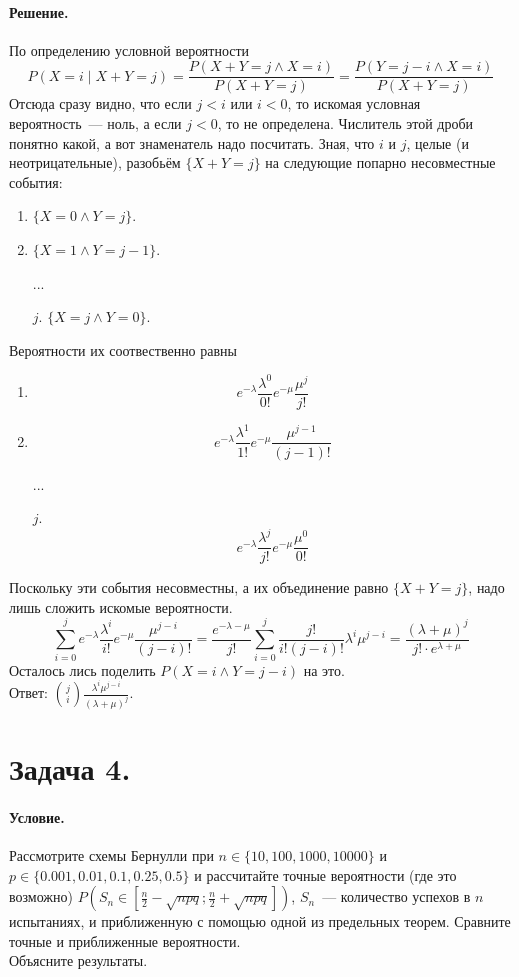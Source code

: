\documentclass{article}
\begin{document}
    \paragraph{Решение.}
    По определению условной вероятности
    $$
    P(X=i\mid X+Y=j)=\frac{P(X+Y=j\land X=i)}{P(X+Y=j)}=\frac{P(Y=j-i\land X=i)}{P(X+Y=j)}
    $$
    Отсюда сразу видно, что если $j<i$ или $i<0$, то искомая условная вероятность~--- ноль, а если $j<0$, то не определена. Числитель этой дроби понятно какой, а вот знаменатель надо посчитать. Зная, что $i$ и $j$, целые (и неотрицательные), разобьём $\{X+Y=j\}$ на следующие попарно несовместные события:
    \begin{enumerate}
        \addtocounter{enumi}{-1}
        \item $\{X=0\land Y=j\}$.
        \item $\{X=1\land Y=j-1\}$.
        \item[...]
        \item[$j$.] $\{X=j\land Y=0\}$.
    \end{enumerate}
    Вероятности их соотвественно равны
    \begin{enumerate}
        \addtocounter{enumi}{-1}
        \item $$e^{-\lambda}\frac{\lambda^0}{0!}e^{-\mu}\frac{\mu^j}{j!}$$
        \item $$e^{-\lambda}\frac{\lambda^1}{1!}e^{-\mu}\frac{\mu^{j-1}}{(j-1)!}$$
        \item[...]
        \item[$j$.] $$e^{-\lambda}\frac{\lambda^j}{j!}e^{-\mu}\frac{\mu^0}{0!}$$
    \end{enumerate}
    Поскольку эти события несовместны, а их объединение равно $\{X+Y=j\}$, надо лишь сложить искомые вероятности.
    $$
    \sum\limits_{i=0}^je^{-\lambda}\frac{\lambda^i}{i!}e^{-\mu}\frac{\mu^{j-i}}{(j-i)!}=\frac{e^{-\lambda-\mu}}{j!}\sum\limits_{i=0}^j\frac{j!}{i!(j-i)!}\lambda^i\mu^{j-i}=\frac{(\lambda+\mu)^j}{j!\cdot e^{\lambda+\mu}}
    $$
    Осталось лись поделить $P(X=i\land Y=j-i)$ на это.\\
    Ответ: $\displaystyle\binom ji\frac{\lambda^i\mu^{j-i}}{(\lambda+\mu)^j}$.
    \section{Задача 4.}
    \paragraph{Условие.}
    Рассмотрите схемы Бернулли при $n\in\{10,100,1000,10000\}$ и $p\in\{0.001,0.01,0.1,0.25,0.5\}$ и рассчитайте точные вероятности (где это возможно) $P\left(S_n\in\left[\frac n2-\sqrt{npq};\frac n2+\sqrt{npq}\right]\right)$, $S_n$~--- количество успехов в $n$ испытаниях, и приближенную с помощью одной из предельных теорем. Сравните точные и приближенные вероятности.\\
    Объясните результаты.
\end{document}

